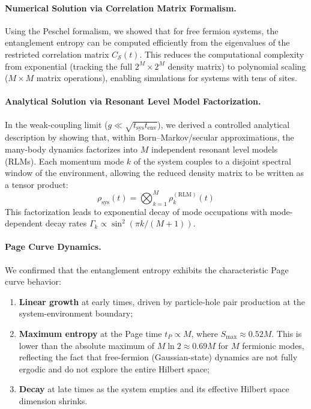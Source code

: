 \documentclass[12pt,oneside,openright]{report}
\theoremstyle{definition}
\theoremstyle{plain}
\theoremstyle{remark}
\begin{document}
\paragraph{Numerical Solution via Correlation Matrix Formalism.}
Using the Peschel formalism, we showed that for free fermion systems, the entanglement entropy can be computed efficiently from the eigenvalues of the restricted correlation matrix $C_{\mathcal{S}}(t)$. This reduces the computational complexity from exponential (tracking the full $2^M \times 2^M$ density matrix) to polynomial scaling ($M \times M$ matrix operations), enabling simulations for systems with tens of sites.

\paragraph{Analytical Solution via Resonant Level Model Factorization.}
In the weak-coupling limit ($g \ll \sqrt{t_{\mathrm{sys}} t_{\mathrm{env}}}$), we derived a controlled analytical description by showing that, within Born--Markov/secular approximations, the many-body dynamics factorizes into $M$ independent resonant level models (RLMs). Each momentum mode $k$ of the system couples to a disjoint spectral window of the environment, allowing the reduced density matrix to be written as a tensor product:
\begin{equation}
\rho_{\mathrm{sys}}(t) = \bigotimes_{k=1}^M \rho_k^{(\mathrm{RLM})}(t)
\end{equation}
This factorization leads to exponential decay of mode occupations with mode-dependent decay rates $\Gamma_k \propto \sin^2(\pi k/(M+1))$.

\paragraph{Page Curve Dynamics.}
We confirmed that the entanglement entropy exhibits the characteristic Page curve behavior:
\begin{enumerate}
\item \textbf{Linear growth} at early times, driven by particle-hole pair production at the system-environment boundary;
\item \textbf{Maximum entropy} at the Page time $t_P \propto M$, where $S_{\mathrm{max}} \approx 0.52 M$. This is lower than the absolute maximum of $M \ln 2 \approx 0.69 M$ for $M$ fermionic modes, reflecting the fact that free-fermion (Gaussian-state) dynamics are not fully ergodic and do not explore the entire Hilbert space;
\item \textbf{Decay} at late times as the system empties and its effective Hilbert space dimension shrinks.
\end{enumerate}
\end{document}
